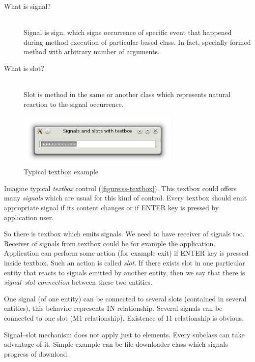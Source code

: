 \begin{description}\label{desc:sig}
\item[What is signal?] \hfill \\
Signal is sign, which signs occurrence of specific event that happened during method execution of particular-based class. In fact, specially formed method with arbitrary number of arguments.
\item[What is slot?] \hfill \\
Slot is method in the same or another class which represents natural reaction to the signal occurrence.
\end{description}

\begin{figure}[ht]
\centering
\includegraphics[width=8cm]{graphics/laboratory/14-ss-textbox.png}
\caption{Typical textbox example}\label{figure:ss-textbox}
\end{figure}

Imagine typical \textit{textbox} control (\autoref{figure:ss-textbox}). This textbox could offers many \textit{signals} which are usual for this kind of control. Every textbox should emit appropriate signal if its content changes or if ENTER key is pressed by application user.

So there is textbox which emits signals. We need to have receiver of signals too. Receiver of signals from textbox could be for example the application. Application can perform some action (for example exit) if ENTER key is pressed inside textbox. Such an action is called \textit{slot}. If there exists slot in one particular entity that reacts to signals emitted by another entity, then we say that there is \textit{signal--slot connection} between these two entities.

One signal (of one entity) can be connected to several slots (contained in several entities), this behavior represents 1\text{:}N relationship. Several signals can be connected to one slot (M\text{:}1 relationship). Existence of 1\text{:}1 relationship is obvious.

Signal--slot mechanism does not apply just to  elements. Every subclass can take advantage of it. Simple example can be file downloader class which signals progress of download.

